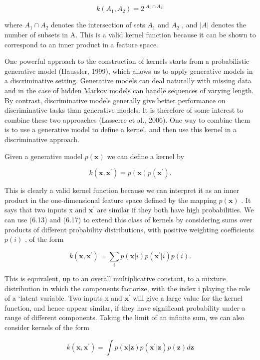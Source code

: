 \documentclass[
  10
]{article}
\begin{document}
\[
k (A _ {1}, A _ {2}) = 2 ^ {| A _ {1} \cap A _ {2} |}\tag{6.27}
\]

where \(A _ { 1 } \cap A _ { 2 }\) denotes the intersection of sets
\(A _ { 1 }\) and \(A _ { 2 }\) , and \(| A |\) denotes the number of
subsets in A. This is a valid kernel function because it can be shown to
correspond to an inner product in a feature space.

One powerful approach to the construction of kernels starts from a
probabilistic generative model (Haussler, 1999), which allows us to
apply generative models in a discriminative setting. Generative models
can deal naturally with missing data and in the case of hidden Markov
models can handle sequences of varying length. By contrast,
discriminative models generally give better performance on
discriminative tasks than generative models. It is therefore of some
interest to combine these two approaches (Lasserre et al., 2006). One
way to combine them is to use a generative model to define a kernel, and
then use this kernel in a discriminative approach.

Given a generative model \(p ( \mathbf { x } )\) we can define a kernel
by

\[
k (\mathbf {x}, \mathbf {x} ^ {\prime}) = p (\mathbf {x}) p (\mathbf {x} ^ {\prime}).\tag{6.28}
\]

This is clearly a valid kernel function because we can interpret it as
an inner product in the one-dimensional feature space defined by the
mapping \(p ( \mathbf { x } )\) . It says that two inputs x and
\(\mathbf { x } ^ { \prime }\) are similar if they both have high
probabilities. We can use (6.13) and (6.17) to extend this class of
kernels by considering sums over products of different probability
distributions, with positive weighting coefficients \(p ( i )\) , of the
form

\[
k (\mathbf {x}, \mathbf {x} ^ {\prime}) = \sum_ {i} p (\mathbf {x} | i) p (\mathbf {x} ^ {\prime} | i) p (i).\tag{6.29}
\]

This is equivalent, up to an overall multiplicative constant, to a
mixture distribution in which the components factorize, with the index i
playing the role of a `latent variable. Two inputs x and
\(\mathbf { x } ^ { \prime }\) will give a large value for the kernel
function, and hence appear similar, if they have significant probability
under a range of different components. Taking the limit of an infinite
sum, we can also consider kernels of the form

\[
k (\mathbf {x}, \mathbf {x} ^ {\prime}) = \int p (\mathbf {x} | \mathbf {z}) p (\mathbf {x} ^ {\prime} | \mathbf {z}) p (\mathbf {z}) d \mathbf {z}\tag{6.30}
\]
\end{document}
